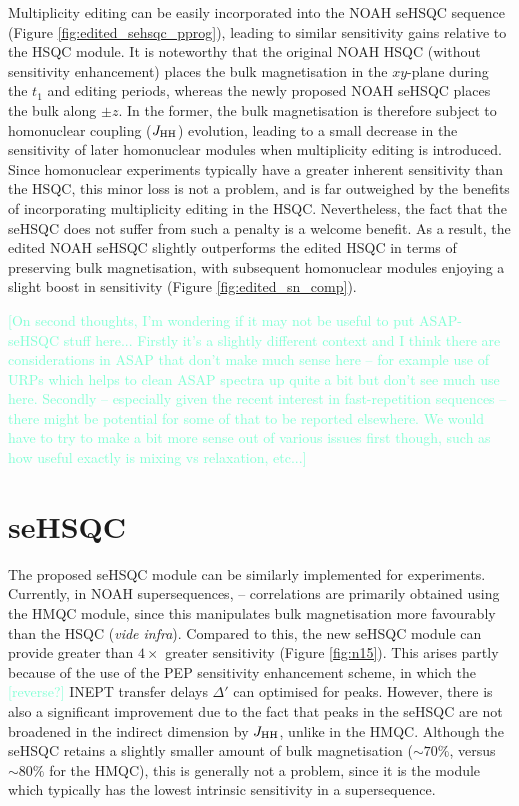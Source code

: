 \documentclass[draft,11pt]{article}
\newcommand*{\proton}{\ce{^{1}H}}
\newcommand*{\nitrogen}{\ce{^{15}N}}
\newcommand*{\hl}[1]{\textcolor{Aquamarine}{[#1]}}
\newcommand*{\jhh}{J_{\ce{HH}}}
\newcommand*{\figref}[1]{Figure \ref{fig:#1}}
\begin{document}
Multiplicity editing can be easily incorporated into the NOAH seHSQC sequence (\figref{edited_sehsqc_pprog}), leading to similar sensitivity gains relative to the HSQC module.
It is noteworthy that the original NOAH HSQC (without sensitivity enhancement) places the bulk magnetisation in the $xy$-plane during the $t_1$ and editing periods, whereas the newly proposed NOAH seHSQC places the bulk along $\pm z$.
In the former, the bulk magnetisation is therefore subject to homonuclear coupling ($\jhh$) evolution, leading to a small decrease in the sensitivity of later homonuclear modules when multiplicity editing is introduced.
Since homonuclear experiments typically have a greater inherent sensitivity than the HSQC, this minor loss is not a problem, and is far outweighed by the benefits of incorporating multiplicity editing in the HSQC.
Nevertheless, the fact that the seHSQC does not suffer from such a penalty is a welcome benefit.
As a result, the edited NOAH seHSQC slightly outperforms the edited HSQC in terms of preserving bulk magnetisation, with subsequent homonuclear modules enjoying a slight boost in sensitivity (\figref{edited_sn_comp}).

\hl{On second thoughts, I'm wondering if it may not be useful to put ASAP-seHSQC stuff here...
    Firstly it's a slightly different context and I think there are considerations in ASAP that don't make much sense here -- for example use of URPs which helps to clean ASAP spectra up quite a bit but don't see much use here.
    Secondly -- especially given the recent interest in fast-repetition sequences -- there might be potential for some of that to be reported elsewhere.
    We would have to try to make a bit more sense out of various issues first though, such as how useful exactly is mixing vs relaxation, etc...}


\section*{\texorpdfstring{\nitrogen{}}{15N} seHSQC}

The proposed seHSQC module can be similarly implemented for \nitrogen{} experiments.
Currently, in NOAH supersequences, \nitrogen{}--\proton{} correlations are primarily obtained using the HMQC module, since this manipulates bulk magnetisation more favourably than the HSQC (\textit{vide infra}).\autocite{Kupce2007MRC, Kupce2017ACIE}
Compared to this, the new seHSQC module can provide greater than $4\times$ greater sensitivity (\figref{n15}).
This arises partly because of the use of the PEP sensitivity enhancement scheme, in which the \hl{reverse?} INEPT transfer delays $\Delta'$ can optimised for  peaks.
However, there is also a significant improvement due to the fact that peaks in the \nitrogen{} seHSQC are not broadened in the indirect dimension by $\jhh$, unlike in the HMQC.
Although the seHSQC retains a slightly smaller amount of bulk magnetisation ($\sim 70\%$, versus $\sim 80\%$ for the HMQC), this is generally not a problem, since it is the \nitrogen{} module which typically has the lowest intrinsic sensitivity in a supersequence.
\end{document}
